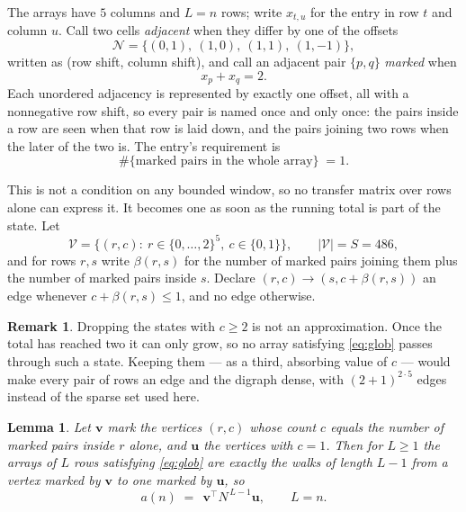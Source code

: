 \documentclass[11pt,a4paper]{article}
\theoremstyle{plain}
\newtheorem{lemma}[theorem]{Lemma}
\theoremstyle{definition}
\newtheorem{remark}[theorem]{Remark}
\begin{document}
The arrays have $5$ columns and $L=n$ rows; write $x_{t,u}$ for the entry in
row $t$ and column $u$. Call two cells \emph{adjacent} when they differ by one of the
offsets
\[
\mathcal N=\{(0,1),\ (1,0),\ (1,1),\ (1,-1)\},
\]
written as (row shift, column shift), and call an adjacent pair $\{p,q\}$
\emph{marked} when
\[
x_{p}+x_{q}=2 .
\]
Each unordered adjacency is represented by exactly one offset, all with a nonnegative row
shift, so every pair is named once and only once: the pairs inside a row are seen when
that row is laid down, and the pairs joining two rows when the later of the two is. The
entry's requirement is
\begin{equation}\label{eq:glob}
\#\{\text{marked pairs in the whole array}\}\;=1.
\end{equation}

This is not a condition on any bounded window, so no transfer matrix over rows alone can
express it. It becomes one as soon as the running total is part of the state. Let
\[
\mathcal V=\bigl\{(r,c):\ r\in\{0,\dots,2\}^{5},\ c\in\{0,1\}\bigr\},
\qquad |\mathcal V|=S=486,
\]
and for rows $r,s$ write $\beta(r,s)$ for the number of marked pairs joining them plus the
number of marked pairs inside $s$. Declare $(r,c)\to(s,c+\beta(r,s))$ an edge whenever
$c+\beta(r,s)\le1$, and no edge otherwise.

\begin{remark}
Dropping the states with $c\ge2$ is not an approximation. Once the total has reached two it
can only grow, so no array satisfying \eqref{eq:glob} passes through such a state. Keeping
them --- as a third, absorbing value of $c$ --- would make every pair of rows an edge and
the digraph dense, with $(2+1)^{2\cdot5}$ edges instead of the sparse set used here.
\end{remark}

\begin{lemma}\label{lem:walk}
Let $\mathbf{v}$ mark the vertices $(r,c)$ whose count $c$ equals the number of marked pairs
inside $r$ alone, and $\mathbf{u}$ the vertices with $c=1$. Then for $L\ge1$ the arrays
of $L$ rows satisfying \eqref{eq:glob} are exactly the walks of length $L-1$ from a
vertex marked by $\mathbf{v}$ to one marked by $\mathbf{u}$, so
\[
a(n)\;=\;\,\mathbf{v}^{\!\top}N^{\,L-1}\mathbf{u},\qquad L=n .
\]
\end{lemma}
\end{document}
